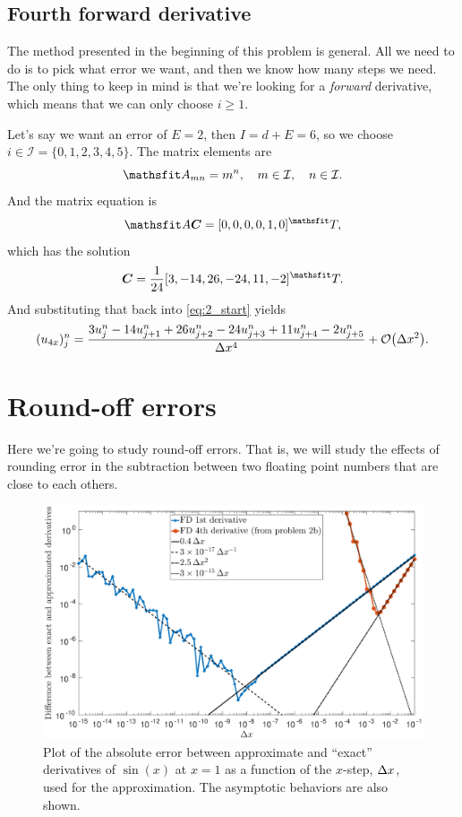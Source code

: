 \documentclass[11pt,letter, swedish, english
]{article}
\begin{document}
\subsection{Fourth forward derivative}
The method presented in the beginning of this problem is general. All
we need to do is to pick what error we want, and then we know how many
steps we need. The only thing to keep in mind is that we're looking
for a \emph{forward} derivative, which means that we can only choose
$i\ge 1$.

Let's say we want an error of $E=2$, then $I=d+E=6$, so we choose
$i\in\mathcal{I}=\{0, 1, 2, 3, 4, 5\}$. The matrix elements are 
\begin{equation}
\mathsf{A}_{mn}=m^{n}
\qcomma m\in\mathcal{I}\qcomma n\in\mathcal{I}.
\end{equation}
And the matrix equation is
\begin{equation}
\mathsf{A}\vb*{C}=[0, 0, 0, 0, 1, 0]^\mathsf{T},
\end{equation}
which has the solution
\begin{equation}
\vb*{C}=\frac{1}{24} [3, -14, 26, -24, 11, -2]^\mathsf{T}.
\end{equation}
And substituting that back into \eqref{eq:2_start} yields
\begin{equation}
(u_{4x})_j^n=\frac{3u_{j}^n-14u_{j+1}^n+26u_{j+2}^n-24u_{j+3}^n+11u_{j+4}^n-2u_{j+5}^n}{\Dx^4}
+\order{\Dx^2}.
\end{equation}


\section{Round-off errors}
Here we're going to study round-off errors. That is, we will
study the effects of rounding error in the subtraction between two
floating point numbers that are close to each others. 

\begin{figure}\centerline{
\includegraphics[width=1.2\textwidth]{3_FD.eps}}
\caption{Plot of the absolute error between approximate and ``exact''
  derivatives of $\sin(x)$ at $x=1$ as a function of the $x$-step,
  $\Delta{x}$, used for the approximation. The asymptotic behaviors are
  also shown.}
\label{fig:3_error}
\end{figure}
\end{document}
